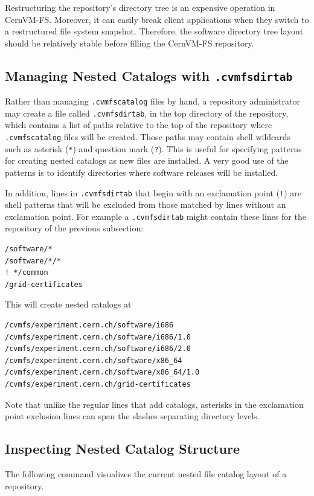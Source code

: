 Restructuring the repository's directory tree is an expensive operation in CernVM-FS.
Moreover, it can easily break client applications when they switch to a restructured file system snapshot.
Therefore, the software directory tree layout should be relatively stable before filling the CernVM-FS repository.

\subsection{Managing Nested Catalogs with \texttt{.cvmfsdirtab}}
Rather than managing \texttt{.cvmfscatalog} files by hand, a repository administrator may create a file called \texttt{.cvmfsdirtab}, in the top directory of the repository, which contains a list of paths relative to the top of the repository where \texttt{.cvmfscatalog} files will be created.
Those paths may contain shell wildcards such as asterisk (\texttt{*}) and question mark (\texttt{?}).
This is useful for specifying patterns for creating nested catalogs as new files are installed.
A very good use of the patterns is to identify directories where software releases will be installed.

In addition, lines in \texttt{.cvmfsdirtab} that begin with an exclamation point (\texttt{!}) are shell patterns that will be excluded from those matched by lines without an exclamation point.
For example a \texttt{.cvmfsdirtab} might contain these lines for the repository of the previous subsection:
\begin{verbatim}
/software/*
/software/*/*
! */common
/grid-certificates
\end{verbatim}
This will create nested catalogs at
\begin{verbatim}
/cvmfs/experiment.cern.ch/software/i686
/cvmfs/experiment.cern.ch/software/i686/1.0
/cvmfs/experiment.cern.ch/software/i686/2.0
/cvmfs/experiment.cern.ch/software/x86_64
/cvmfs/experiment.cern.ch/software/x86_64/1.0
/cvmfs/experiment.cern.ch/grid-certificates
\end{verbatim}
Note that unlike the regular lines that add catalogs, asterisks in the exclamation point exclusion lines can span the slashes separating directory levels.

\subsection{Inspecting Nested Catalog Structure}
\label{sct:inspectnestedcatalogs}
The following command visualizes the current nested file catalog layout of a repository.

